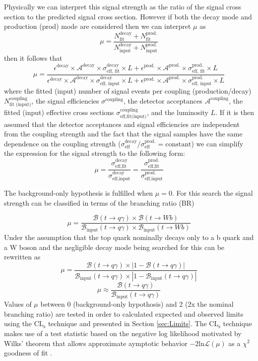 Physically we can interpret this signal strength as the ratio of the signal cross section to the predicted signal cross section.  However if both the decay mode and production (prod) mode are considered then we can interpret $\mu$ as 
\[\mu = \frac{N_\text{fit}^\text{decay} + N_\text{fit}^\text{prod.}}{N_\text{input}^\text{decay} + N_\text{input}^\text{prod.}}
\]then it follows that 
\[\mu = \frac{\epsilon^\text{decay}\times \mathcal{A}^\text{decay} \times \sigma^\text{decay}_\text{eff, fit}\times L+\epsilon^\text{prod.}\times \mathcal{A}^\text{prod.} \times \sigma^\text{prod.}_\text{eff, fit} \times L}{\epsilon^\text{decay}\times \mathcal{A}^\text{decay} \times \sigma^\text{decay}_\text{eff, input} \times L+\epsilon^\text{prod.}\times \mathcal{A}^\text{prod.} \times \sigma^\text{prod.}_\text{eff, input}\times L}
\]
where the fitted (input) number of signal events per coupling (production/decay) $N_\text{fit (input)}^\text{coupling}$, the signal efficiencies $\sigma^\text{coupling}$, the detector acceptances $\mathcal{A}^\text{coupling}$, the fitted (input) effective cross sections $\sigma_\text{eff,fit(input)}^\text{coupling}$, and the luminosity $L$.  If it is then assumed that the detector acceptances and signal efficiencies are independent from the coupling strength and the fact that the signal samples have the same dependence on the coupling strength ($\sigma_\text{eff}^\text{decay}/ \sigma_\text{eff}^\text{prod.} = \text{constant}$) we can simplify the expression for the signal strength to the following form:
\[ \mu = \frac{\sigma_\text{eff,fit}^\text{decay}}{\sigma_\text{eff,input}^\text{decay}}=\frac{\sigma_\text{eff,fit}^\text{prod.}}{\sigma_\text{eff,input}^\text{prod.}}
\]

The background-only hypothesis is fulfilled when $\mu=0$.
For this search the signal strength can be classified in terms of the branching ratio (BR)

\[ \mu = \frac{\mathcal{B}(t\rightarrow q\gamma) \times \mathcal{B}(t\rightarrow Wb)}{\mathcal{B}_\text{input}(t\rightarrow q\gamma) \times \mathcal{B}_\text{input}(t\rightarrow Wb)}
\]
Under the assumption that the top quark nominally decays only to a b quark and a W boson and the negligible decay mode being searched for this can be rewritten as 
\[ \mu = \frac{\mathcal{B}(t\rightarrow q\gamma) \times|1-\mathcal{B}(t\rightarrow q\gamma)|}{\mathcal{B}_\text{input}(t\rightarrow q\gamma) \times|1-\mathcal{B}_\text{input}(t\rightarrow q\gamma)|}
\]
\[ \mu \approx \frac{\mathcal{B}(t\rightarrow q\gamma)}{\mathcal{B}_\text{input}(t\rightarrow q\gamma)}
\]
Values of $\mu$ between 0 (background-only hypothosis) and 2 (2x the nominal branching ratio) are tested in order to calculated expected and observed limits using the $\text{CL}_\text{s}$ technique\cite{Read:2002hq} and presented in Section \ref{sec:Limits}.  The $\text{CL}_\text{s}$ technique makes use of a test statistic based on the negative log likelihood motivated by  Wilks' theorem that allows approximate aymptotic behavior $-2 \text{ln} \mathcal{L}(\mu)$ as a $\chi^2$ goodness of fit \cite{Wilks:1938dza}. %




